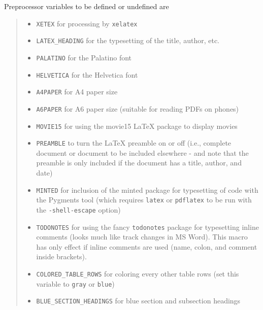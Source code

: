 \documentclass[a4paper]{article}
\begin{document}
Preprocessor variables to be defined or undefined are
%
\begin{quote}
%
\begin{itemize}

\item \texttt{XETEX} for processing by \texttt{xelatex}

\item \texttt{LATEX\_HEADING} for the typesetting of the title, author, etc.

\item \texttt{PALATINO} for the Palatino font

\item \texttt{HELVETICA} for the Helvetica font

\item \texttt{A4PAPER} for A4 paper size

\item \texttt{A6PAPER} for A6 paper size (suitable for reading PDFs on phones)

\item \texttt{MOVIE15} for using the movie15 LaTeX package to display movies

\item \texttt{PREAMBLE} to turn the LaTeX preamble on or off (i.e., complete document
or document to be included elsewhere - and note that
the preamble is only included
if the document has a title, author, and date)

\item \texttt{MINTED} for inclusion of the minted package for typesetting of
code with the Pygments tool (which requires \texttt{latex}
or \texttt{pdflatex} to be run with the \texttt{-shell-escape} option)

\item \texttt{TODONOTES} for using the fancy \texttt{todonotes} package for typesetting
inline comments (looks much like track changes in MS Word). This
macro has only effect if inline comments are used (name, colon,
and comment inside brackets).

\item \texttt{COLORED\_TABLE\_ROWS} for coloring every other table rows (set this
variable to \texttt{gray} or \texttt{blue})

\item \texttt{BLUE\_SECTION\_HEADINGS} for blue section and subsection headings

\end{itemize}

\end{quote}
\end{document}
